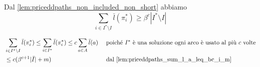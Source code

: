 \begin{corollario}\label{cor:priceddpaths_cor_1}
	Dal \cref{lem:priceddpaths_non_included_non_short} abbiamo
	$$
		\sum_{i \in I^* \setminus I} \bar{l}(\pi_i^*) \geq \beta^c |I^*\setminus I|
	$$
\end{corollario}

\begin{corollario}\label{cor:priceddpaths_cor_2}
	\begin{align*}
		 & \sum_{i \in I^* \setminus I} \bar{l}(\pi_i^*) \leq \sum_{i \in I^*}\bar{l}(\pi_i^*) \leq c \sum_{a \in A} \bar{l}(a) &  & \text{ poiché  } I^* \text{ è una soluzione ogni arco è usato al più } c \text { volte}           \\
		 & \leq c (\beta^{c+1}|\bar{I}|+m)                                                                                      &  & \text{ dal \cref{lem:priceddpaths_sum_l_a_leq_bc_i_m}}
	\end{align*}
\end{corollario}

